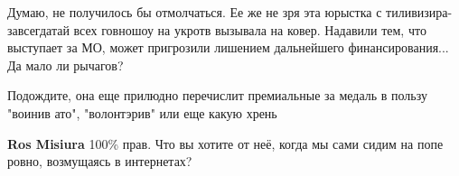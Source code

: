 \begin{itemize}
\begin{itemize}
Думаю, не получилось бы отмолчаться. Ее же не зря эта юрыстка с
тиливизира-завсегдатай всех говношоу на укротв вызывала на ковер. Надавили тем,
что выступает за МО, может пригрозили лишением дальнейшего финансирования... Да
мало ли рычагов?

Подождите, она еще прилюдно перечислит премиальные за медаль в пользу "воинив
ато", "волонтэрив" или еще какую хрень


 
\textbf{Ros Misiura} 100\% прав. Что вы хотите от неё, когда мы сами сидим на попе ровно, возмущаясь в интернетах?

\end{itemize}

\end{itemize}

